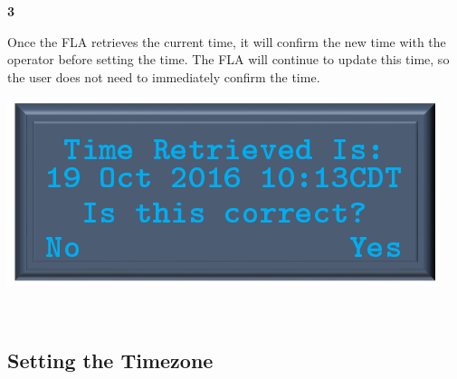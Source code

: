 \documentclass[11pt, oneside]{book}
\begin{document}
\noindent\begin{minipage}{0.45\textwidth}%
	\begin{center}
		\textbf{3}
	\end{center}
	Once the FLA retrieves the current time, it will confirm the new time with the operator before setting the time. The FLA will continue to update this time, so the user does not need to immediately confirm the time.
\end{minipage}%
\hfill%
\begin{minipage}{0.45\textwidth} 
	\includegraphics[width=\linewidth]{../media/pstricks_files/09_update_system_clock_received}
\end{minipage}\\


\subsection{\label{sub:Setting-the-Timezone-1}Setting the Timezone}
\end{document}
